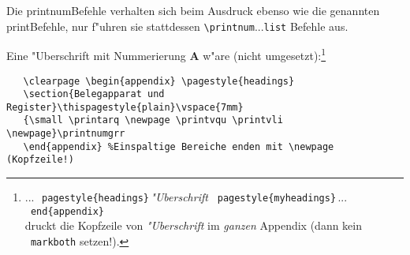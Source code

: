 \documentclass[12pt,a4paper]{article}
\newcommand{\pbs}{\string\ \unskip}
\newcommand{\bs}{\protect\pbs}
\begin{document}

\vspace{1.25ex}\noindent
Die printnum\hy Befehle verhalten sich beim Ausdruck ebenso wie die genannten
print\hy Befehle, nur f"uhren sie stattdessen \verb|\printnum|...\verb|list|\hy 
Befehle aus. 

\vspace{1ex}\noindent
Eine "Uberschrift mit Nummerierung \textbf{A} w"are 
(nicht umgesetzt):\footnote{
...\,\texttt{\bs pagestyle\{headings\}}\,\textit{"Uberschrift} 
\texttt{\bs pagestyle\{myheadings\}}\,...\,\texttt{\bs end\{appendix\}} \\
druckt die Kopfzeile von \textit{"Uberschrift} im \textit{ganzen} Appendix
(dann kein \texttt{\bs markboth} setzen!).\hspace*{.2em}}

\vspace{-1.25ex}
{\footnotesize
\begin{verbatim}
   \clearpage \begin{appendix} \pagestyle{headings}
   \section{Belegapparat und Register}\thispagestyle{plain}\vspace{7mm}
   {\small \printarq \newpage \printvqu \printvli \newpage}\printnumgrr
   \end{appendix} %Einspaltige Bereiche enden mit \newpage (Kopfzeile!)
\end{verbatim}}
\end{document}
